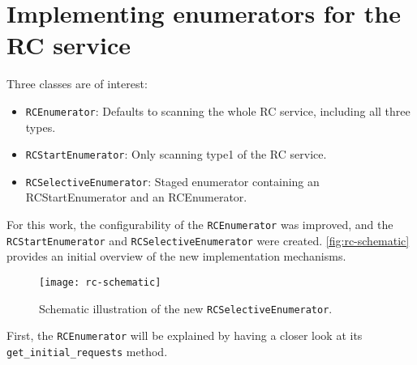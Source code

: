 \section{Implementing enumerators for the RC service}

Three classes are of interest:

\begin{itemize}
    \item \texttt{RCEnumerator}: Defaults to scanning the whole RC service, including all three types.
    \item \texttt{RCStartEnumerator}: Only scanning type1 of the RC service.
    \item \texttt{RCSelectiveEnumerator}: Staged enumerator containing an RCStartEnumerator and an RCEnumerator.
\end{itemize}

For this work, the configurability of the \texttt{RCEnumerator} was improved, and the \texttt{RCStartEnumerator} and \texttt{RCSelectiveEnumerator} were created. \autoref{fig:rc-schematic} provides an initial overview of the new implementation mechanisms.

\begin{figure}[htb]
    \centering
    \texttt{[image: rc-schematic]}
    \caption{Schematic illustration of the new \texttt{RCSelectiveEnumerator}.}
    \label{fig:rc-schematic}
\end{figure}

First, the \texttt{RCEnumerator} will be explained by having a closer look at its \texttt{get_initial_requests} method.


